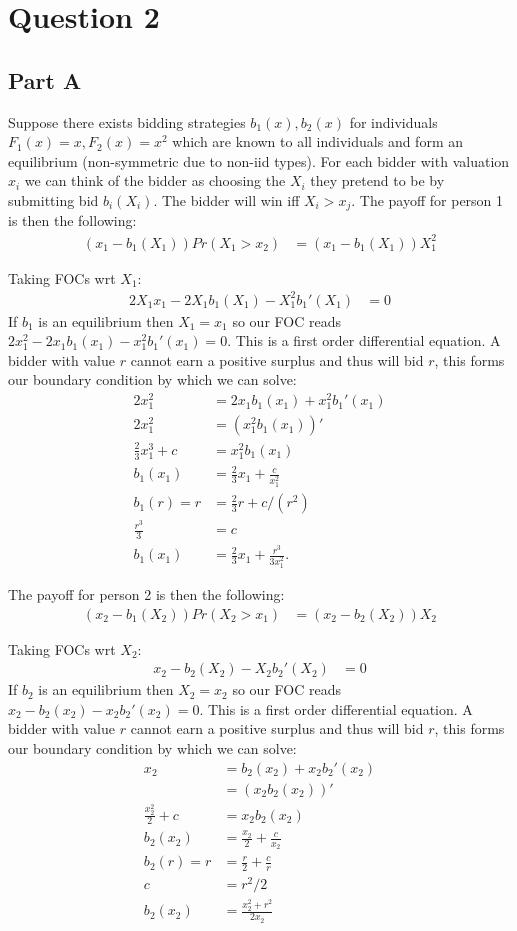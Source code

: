 \documentclass[11pt]{article} %
\begin{document}
\section{Question 2}
\subsection{Part A}
Suppose there exists bidding strategies $b_1(x),b_2(x)$ for individuals $F_1(x) = x,F_2(x) = x^2$ which are known to all individuals and form an equilibrium (non-symmetric due to non-iid types). For each bidder with valuation $x_i$ we can think of the bidder as choosing the $X_i$ they pretend to be by submitting bid $b_i(X_i)$. The bidder will win iff $X_i>x_j$. The payoff for person 1 is then the following:
\begin{align*}
(x_1-b_1(X_1))Pr(X_1>x_2) &= (x_1-b_1(X_1))X_1^2
\end{align*}

Taking FOCs wrt $X_1$:
\begin{align*}
2X_1x_1 -2X_1b_1(X_1) - X_1^2b_1'(X_1) &= 0
\end{align*}
If $b_1$ is an equilibrium then $X_1 = x_1$ so our FOC reads $2x_1^2 -2x_1b_1(x_1) - x_1^2b_1'(x_1) = 0$. This is a first order differential equation. A bidder with value $r$ cannot earn a positive surplus and thus will bid $r$, this forms our boundary condition by which we can solve:
\begin{align*}
2x_1^2&= 2x_1b_1(x_1) + x_1^2b_1'(x_1) \\
2x_1^2&= (x_1^2 b_1(x_1))'\\
\frac{2}{3}x_1^3 + c &= x_1^2b_1(x_1) \\
b_1(x_1) &= \frac{2}{3}x_1 + \frac{c}{x_1^2}\\
b_1(r) = r &= \frac{2}{3}r + c/(r^2)\\
\frac{r^3}{3} &= c\\
b_1(x_1) &= \frac{2}{3}x_1 + \frac{r^3}{3x_1^2}.
\end{align*}

The payoff for person 2 is then the following:
\begin{align*}
(x_2-b_1(X_2))Pr(X_2>x_1) &= (x_2-b_2(X_2))X_2
\end{align*}

Taking FOCs wrt $X_2$:
\begin{align*}
x_2 -b_2(X_2) - X_2b_2'(X_2) &= 0
\end{align*}
If $b_2$ is an equilibrium then $X_2 = x_2$ so our FOC reads $x_2 -b_2(x_2) - x_2b_2'(x_2) = 0$. This is a first order differential equation. A bidder with value $r$ cannot earn a positive surplus and thus will bid $r$, this forms our boundary condition by which we can solve:
\begin{align*}
x_2&= b_2(x_2) + x_2b_2'(x_2) \\
&= (x_2b_2(x_2))'\\
\frac{x_2^2}{2} + c &= x_2b_2(x_2)\\
b_2(x_2) &= \frac{x_2}{2} + \frac{c}{x_2}\\
b_2(r) = r &= \frac{r}{2} + \frac{c}{r}\\
c&= r^2/2\\
b_2(x_2) &= \frac{x_2^2 + r^2}{2x_2} 
\end{align*}
\end{document}
